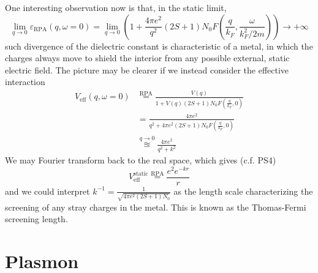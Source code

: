 One interesting observation now is that, in the static limit,
\[ \lim_{q\rightarrow 0} \varepsilon _{\mathrm{RPA}}\left( q,\omega =0 \right) =\lim_{q\rightarrow 0} \left( 1+\frac{4\pi e^2}{q^2}\left( 2S+1 \right) N_0F\left( \frac{q}{k_F},\frac{\omega}{k_{F}^{2}/2m} \right) \right) \rightarrow +\infty \]
such divergence of the dielectric constant is characteristic of a metal, in which the charges always move to shield the interior from any possible external, static electric field. The picture may be clearer if we instead consider the effective interaction
\begin{align*}
    V_{\mathrm{eff}}\left( q,\omega =0 \right) &\stackrel{\text{RPA}}{=}\frac{V\left( q \right)}{1+V\left( q \right) \left( 2S+1 \right) N_0F\left( \frac{q}{k_F},0 \right)}\\
    &=\frac{4\pi e^2}{q^2+4\pi e^2\left( 2S+1 \right) N_0F\left( \frac{q}{k_F},0 \right)}\\
    &\stackrel{q\to 0}{\approxeq}\frac{4\pi e^2}{q^2+k^2}
\end{align*}
We may Fourier transform back to the real space, which gives (c.f. PS4)
\[ V_{\mathrm{eff}}^{\mathrm{static}}\stackrel{\text{RPA}}{=}\frac{e^2e^{-kr}}{r}\]
and we could interpret $k^{-1}=\frac{1}{\sqrt{4\pi e^2\left( 2S+1 \right) N_0}}$ as the length scale characterizing the screening of any stray charges in the metal. This is known as the Thomas-Fermi screening length.

\section{Plasmon}

